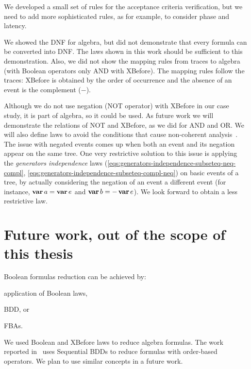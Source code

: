 \documentclass[12pt,openright,twoside,a4paper,oldfontcommands,english,brazil,draft]{abntex2}
\theoremstyle{theo}
\def\varop{\ensuremath\operatorname{\mathbf{var}}}
\newcommand{\var}[1]{\ensuremath\varop #1}
\begin{document}
We developed a small set of rules for the acceptance criteria verification, but we need to add more sophisticated rules, as for example, to consider phase and latency.

We showed the DNF for \ac{algebra}, but did not demonstrate that every formula can be converted into DNF.
The laws shown in this work should be sufficient to this demonstration.
Also, we did not show the mapping rules from traces to \ac{algebra} (with Boolean operators only \ac{AND} with \ac{XBefore}).
The mapping rules follow the traces: \ac{XBefore} is obtained by the order of occurrence and the absence of an event is the complement ($-$).

Although we do not use negation (\ac{NOT} operator) with \ac{XBefore} in our case study, it is part of \ac{algebra}, so it could be used.
As future work we will demonstrate the relations of \ac{NOT} and \ac{XBefore}, as we did for \ac{AND} and \ac{OR}.
We will also define laws to avoid the conditions that cause non-coherent analysis~\cite{Oliv2006}.
The issue with negated events comes up when both an event and its negation appear on the same tree.
One very restrictive solution to this issue is applying the \emph{generators independence} laws (\ref{eqs:generators-independence-subseteq-neq-compl}, \ref{eqs:generators-independence-subseteq-compl-neq}) on basic events of a tree, by actually considering the negation of an event a different event (for instance, $\var a= \var e$ and $\var b=-\var e$).
We look forward to obtain a less restrictive law.


\section{Future work, out of the scope of this thesis}


Boolean formulas reduction can be achieved by:
\begin{alineasinline}
  \item application of Boolean laws,
  \item \ac{BDD}, or
  \item \acp{FBA}.
\end{alineasinline}
We used Boolean and \ac{XBefore} laws to reduce \ac{algebra} formulas.
%
The work reported in~\cite{TXD2011,XTD2012} uses Sequential BDDs to reduce formulas with order-based operators.
%
We plan to use similar concepts in a future work.
\end{document}
